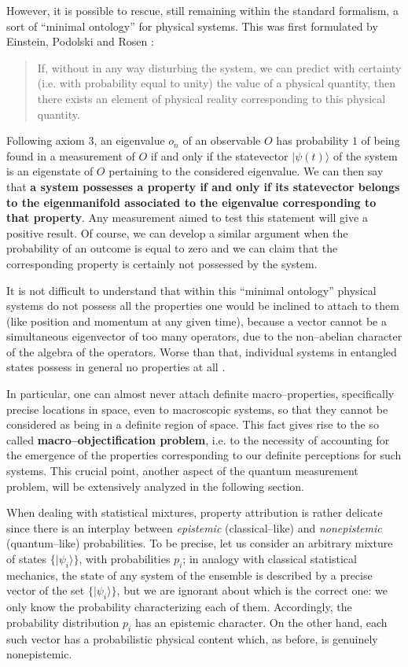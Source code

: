 \documentclass[10pt,a4paper]{article}
\begin{document}
However, it is possible to rescue, still remaining within the
standard formalism, a sort of ``minimal ontology'' for physical
systems. This was first formulated  by Einstein, Podolski and
Rosen \cite{epr}:
\begin{quotation}
If, without in any way disturbing the system, we can predict with
certainty (i.e. with probability equal to unity) the value of a
physical quantity, then there exists an element of physical
reality corresponding to this physical quantity.
\end{quotation}
Following axiom 3, an eigenvalue $o_{n}$ of an observable $O$ has
probability $1$ of being found in a measurement of $O$ if and only
if the statevector $|\psi(t)\rangle$ of the system is an
eigenstate of $O$ pertaining to the considered eigenvalue. We can
then say that {\bf a system possesses a property if and only if
its statevector belongs to the eigenmanifold associated to the
eigenvalue corresponding to that property}. Any measurement aimed
to test this statement will give a positive result. Of course, we
can develop a similar argument when the probability of an outcome
is equal to zero and we can claim that the corresponding property is
certainly not possessed by the system.

It is not difficult to understand that within this ``minimal
ontology'' physical systems do not possess all the properties one
would be inclined to attach to them (like position and momentum at
any given time), because a vector cannot be a simultaneous
eigenvector of too many operators, due to the non--abelian
character of the algebra of the operators. Worse than that,
individual systems in entangled states possess in general no
properties at all \cite{gm}.

In particular, one can almost never attach definite
macro--properties, specifically precise locations in space, even
to macroscopic systems, so that they cannot be considered as being
in a definite region of space. This fact gives rise to the so
called {\bf macro--objectification problem}, i.e. to the necessity
of accounting for the emergence of the properties corresponding to
our definite perceptions for such systems. This crucial point,
another aspect of the quantum measurement problem, will be
extensively analyzed in the following section.

When dealing with statistical mixtures, property attribution is
rather delicate since there is an interplay between {\it
epistemic} (classical--like) and {\it nonepistemic}
(quantum--like) probabilities. To be precise, let us consider an
arbitrary mixture of states $\{|\psi_{i}\rangle\}$, with
probabilities $p_{i}$; in analogy with classical statistical
mechanics, the state of any system of the ensemble is described by
a precise vector of the set $\{|\psi_{i}\rangle\}$, but we are
ignorant about which is the correct one: we only know the
probability characterizing each of them. Accordingly, the
probability distribution $p_{i}$ has an epistemic character. On
the other hand, each such vector has a probabilistic physical
content which, as before, is genuinely nonepistemic.
\end{document}
